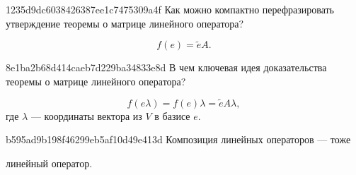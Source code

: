 
\begin{note}{1235d9dc6038426387ee1c7475309a4f}
    Как можно компактно перефразировать утверждение теоремы о матрице линейного оператора?

    \begin{cloze}{1}
        \[
            f(e) = \tilde e A.
        \]
    \end{cloze}
\end{note}

\begin{note}{8e1ba2b68d414caeb7d229ba34833e8d}
    В чем ключевая идея доказательства теоремы о матрице линейного оператора?

    \begin{cloze}{1}
        \[
            f(e\lambda) = f(e)\lambda = \tilde e A \lambda,
        \]
        где \( \lambda \) --- координаты вектора из \( V \) в базисе \( e \).
    \end{cloze}
\end{note}

\begin{note}{b595ad9b198f46299eb5af10d49e413d}
    Композиция линейных операторов --- тоже \begin{icloze}{1}линейный оператор.\end{icloze}
\end{note}

